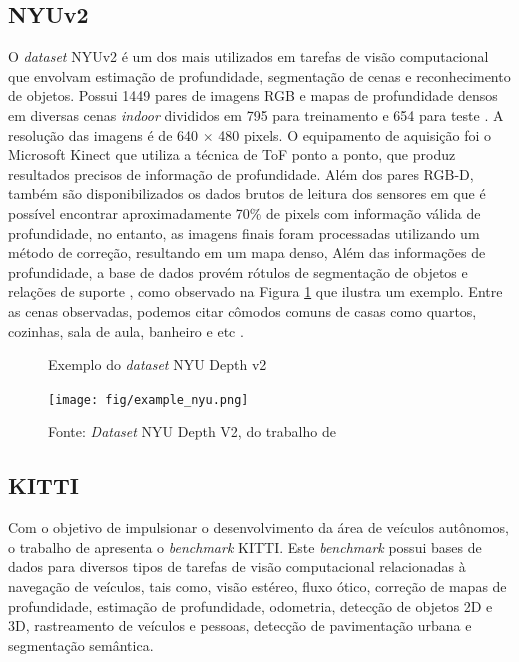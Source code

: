 \subsection{NYUv2}



O \textit{dataset} NYUv2 é um dos mais utilizados em tarefas de visão computacional que envolvam estimação de profundidade, segmentação de cenas e reconhecimento de objetos. Possui 1449 pares de imagens RGB e mapas de profundidade densos em diversas cenas \textit{indoor} divididos em 795 para treinamento e 654 para teste \cite{silberman2012indoor}. A resolução das imagens é de 640 $\times$ 480 pixels. O equipamento de aquisição foi o Microsoft Kinect que utiliza a técnica de ToF ponto a ponto, que produz resultados precisos de informação de profundidade. Além dos pares RGB-D, também são disponibilizados os dados brutos de leitura dos sensores em que é possível encontrar aproximadamente 70\% de pixels com informação válida de profundidade, no entanto, as imagens finais foram processadas utilizando um método de correção, resultando em um mapa denso,  Além das informações de profundidade, a base de dados provém rótulos de segmentação de objetos e relações de suporte \cite{lahiri2024deep}, como observado na Figura \ref{exnyuv2} que ilustra um exemplo. Entre as cenas observadas, podemos citar cômodos comuns de casas como quartos, cozinhas, sala de aula, banheiro e etc \cite{silberman2012indoor}.

\begin{figure}[h!]
    \centering
    \caption{Exemplo do \textit{dataset} NYU Depth v2}
    \texttt{[image: fig/example\_nyu.png]}
    \caption*{Fonte: \textit{Dataset} NYU Depth V2, do trabalho de }
    \label{exnyuv2}
\end{figure}

\newpage

\subsection{KITTI}

Com o objetivo de impulsionar o desenvolvimento da área de veículos autônomos, o trabalho de  apresenta o \textit{benchmark} KITTI. Este \textit{benchmark} possui bases de dados para diversos tipos de tarefas de visão computacional relacionadas à navegação de veículos, tais como, visão estéreo, fluxo ótico, correção de mapas de profundidade, estimação de profundidade, odometria, detecção de objetos 2D e 3D, rastreamento de veículos e pessoas, detecção de pavimentação urbana e segmentação semântica. 



